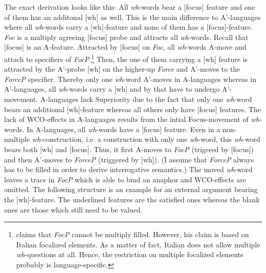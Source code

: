 \documentclass[output=paper,colorlinks,citecolor=brown]{langscibook}
\begin{document}
The exact derivation looks like this: All \textit{wh}-words bear a [focus] feature and one of them has an additonal [wh] as well. This is the main difference to A'-languages where all \textit{wh}-words carry a [wh]-feature and none of them has a [focus]-feature. \emph{Foc} is a multiply agreeing [focus] probe and attracts all \textit{wh}-words. Recall that [focus] is an A-feature. Attracted by [focus] on \emph{Foc}, all \textit{wh}-words A-move and attach to specifiers of \emph{FocP}.\footnote{\citet{rizzi1997fine} claims that \emph{FocP} cannot be multiply filled. However, his claim is based on Italian focalized elements. As a matter of fact, Italian does not allow multiple \textit{wh}-questions at all. Hence, the restriction on multiple focalized elements probably is language-specific.} Then, the one of them carrying a [wh] feature is attracted by the A'-probe [wh] on the higher-up \emph{Force} and A'-moves to the \emph{ForceP} specifier. Thereby only one \textit{wh}-word A'-moves in A-languages whereas in A'-languages, all \textit{wh}-words carry a [wh] and by that have to undergo A'-movement. A-languages lack Superiority due to the fact that only one \textit{wh}-word bears an additional [wh]-feature whereas all others only have [focus] features. 
The lack of WCO-effects in A-languages results from the intial Focus-movement of \textit{wh}-words. In A-languages, all \textit{wh}-words have a [focus] feature. Even in a non-multiple \textit{wh}-construction, i.e. a construction with only one \textit{wh}-word, this \textit{wh}-word bears both [wh] and [focus]. Thus, it first A-moves to \emph{FocP} (trigered by [focus]) and then A'-moves to \emph{ForceP} (triggered by [wh]). (I assume that \emph{ForceP} always has to be filled in order to derive interrogative semantics.) The moved \textit{wh}-word leaves a trace in \emph{FocP} which is able to bind an anaphor and WCO-effects are omitted. The following structure is an example for an external argument bearing the [wh]-feature. The underlined features are the satisfied ones whereas the blank ones are those which still need to be valued.
\end{document}
